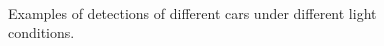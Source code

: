 \begin{figure}[p]
\hspace{2mm}
\hspace{2mm}
\\
\caption{Examples of detections of different cars under different light conditions.}
\label{fig:detection_examples}
\end{figure}
